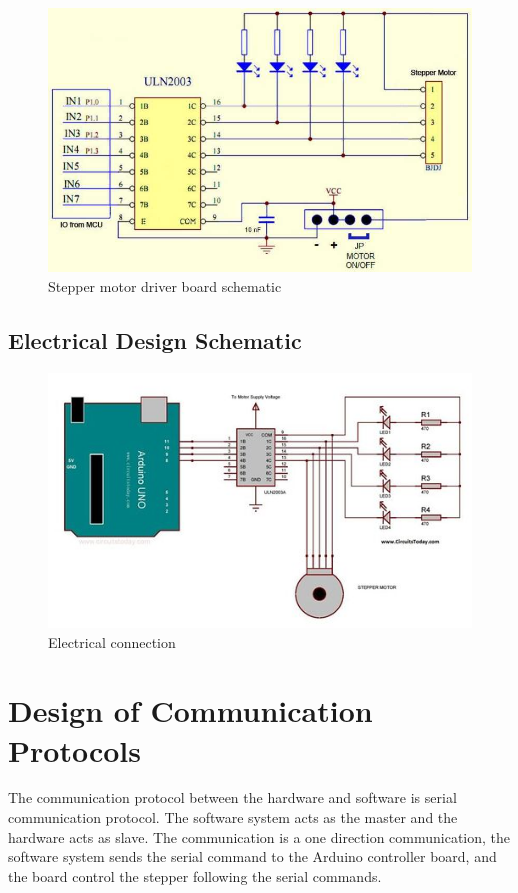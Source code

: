 \documentclass[12pt, titlepage]{article}
\begin{document}
	\begin{figure}[H]
	\caption{Stepper motor driver board schematic}
	\centering
	\includegraphics[width=\textwidth]{ULN2003}
	\end{figure}

\subsection{Electrical Design Schematic}
\begin{figure}[H]
\caption{Electrical connection}
\centering
\includegraphics[width=\textwidth]{board-motor}
\end{figure}






\section{Design of Communication Protocols}


The communication protocol between the hardware and software is serial communication protocol. The software system acts as the master and the hardware acts as slave. The communication is a one direction communication, the software system sends the serial command to the Arduino controller board, and the board control the stepper following the serial commands.
\end{document}
